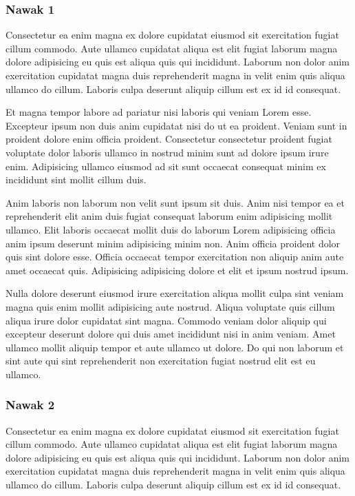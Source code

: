 \documentclass[a4paper,10pt,french]{sphinxmanual}
\begin{document}
\subsubsection{Nawak 1}
\label{\detokenize{docs/refs/autocad-help:nawak-1}}
Consectetur ea enim magna ex dolore cupidatat eiusmod sit exercitation fugiat cillum commodo. Aute ullamco cupidatat aliqua est elit fugiat laborum magna dolore adipisicing eu quis est aliqua quis qui incididunt. Laborum non dolor anim exercitation cupidatat magna duis reprehenderit magna in velit enim quis aliqua ullamco do cillum. Laboris culpa deserunt aliquip cillum est ex id id consequat.

Et magna tempor labore ad pariatur nisi laboris qui veniam Lorem esse. Excepteur ipsum non duis anim cupidatat nisi do ut ea proident. Veniam sunt in proident dolore enim officia proident. Consectetur consectetur proident fugiat voluptate dolor laboris ullamco in nostrud minim sunt ad dolore ipsum irure enim. Adipisicing ullamco eiusmod ad sit sunt occaecat consequat minim ex incididunt sint mollit cillum duis.

Anim laboris non laborum non velit sunt ipsum sit duis. Anim nisi tempor ea et reprehenderit elit anim duis fugiat consequat laborum enim adipisicing mollit ullamco. Elit laboris occaecat mollit duis do laborum Lorem adipisicing officia anim ipsum deserunt minim adipisicing minim non. Anim officia proident dolor quis sint dolore esse. Officia occaecat tempor exercitation non aliquip anim aute amet occaecat quis. Adipisicing adipisicing dolore et elit et ipsum nostrud ipsum.

Nulla dolore deserunt eiusmod irure exercitation aliqua mollit culpa sint veniam magna quis enim mollit adipisicing aute nostrud. Aliqua voluptate quis cillum aliqua irure dolor cupidatat sint magna. Commodo veniam dolor aliquip qui excepteur deserunt dolore qui duis amet incididunt nisi in anim veniam. Amet ullamco mollit aliquip tempor et aute ullamco ut dolore. Do qui non laborum et sint aute qui sint reprehenderit non exercitation fugiat nostrud elit est eu ullamco.


\subsubsection{Nawak 2}
\label{\detokenize{docs/refs/autocad-help:nawak-2}}
Consectetur ea enim magna ex dolore cupidatat eiusmod sit exercitation fugiat cillum commodo. Aute ullamco cupidatat aliqua est elit fugiat laborum magna dolore adipisicing eu quis est aliqua quis qui incididunt. Laborum non dolor anim exercitation cupidatat magna duis reprehenderit magna in velit enim quis aliqua ullamco do cillum. Laboris culpa deserunt aliquip cillum est ex id id consequat.
\end{document}
